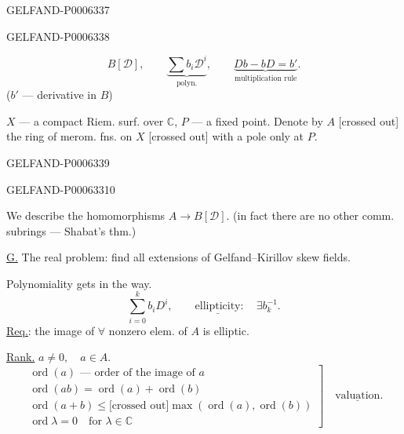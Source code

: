 \begin{GelfandAdjacentEvidence}{GELFAND-P000633}{7}

\end{GelfandAdjacentEvidence}
\begin{GelfandAdjacentEvidence}{GELFAND-P000633}{8}

\[
B[\mathcal D],\qquad
\underbrace{\sum b_i\mathcal D^i}_{\text{polyn.}},\qquad
\underbrace{Db-bD=b'}_{\text{multiplication rule}}.
\]
(\(b'\) --- derivative in \(B\))

\(X\) --- a compact Riem. surf. over \(\mathbb C\), \(P\) --- a fixed point.
Denote by \(A\) [crossed out] the ring of merom. fns. on \(X\) [crossed out]
with a pole only at \(P\).
\end{GelfandAdjacentEvidence}
\begin{GelfandAdjacentEvidence}{GELFAND-P000633}{9}

\end{GelfandAdjacentEvidence}
\begin{GelfandAdjacentEvidence}{GELFAND-P000633}{10}


We describe the homomorphisms \(A\to B[\mathcal D]\).
(in fact there are no other comm. subrings --- Shabat’s thm.)

\underline{G.} The real problem: find all extensions of Gelfand--Kirillov skew fields.

Polynomiality gets in the way.
\[
\sum_{i=0}^{k} b_iD^i,\qquad
\underline{\text{ellipticity}}:\quad\exists b_k^{-1}.
\]
\underline{Req.}: the image of \(\forall\) nonzero elem. of \(A\) is elliptic.

\underline{Rank.} \(a\ne0,\quad a\in A\).
\[
\left.
\begin{gathered}
\operatorname{ord}(a)\text{ --- order of the image of }a\\
\operatorname{ord}(ab)=\operatorname{ord}(a)+\operatorname{ord}(b)\\
\operatorname{ord}(a+b)\le\text{[crossed out]}\max(\operatorname{ord}(a),\operatorname{ord}(b))\\
\operatorname{ord}\lambda=0\quad\text{for }\lambda\in\mathbb C
\end{gathered}
\right]\quad\underline{\text{valuation}}.
\]
\end{GelfandAdjacentEvidence}

